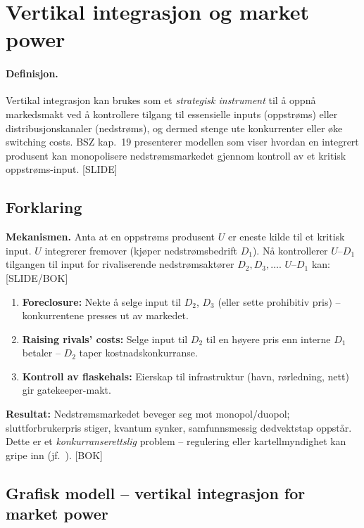 \section{Vertikal integrasjon og market power}\label{thr:vertical-integration-market-power}

\paragraph{Definisjon.} Vertikal integrasjon kan brukes som et \emph{strategisk instrument} til å oppnå markedsmakt ved å kontrollere tilgang til essensielle inputs (oppstrøms) eller distribusjonskanaler (nedstrøms), og dermed stenge ute konkurrenter eller øke switching costs. BSZ kap.\ 19 presenterer modellen som viser hvordan en integrert produsent kan monopolisere nedstrømsmarkedet gjennom kontroll av et kritisk oppstrøms-input. [SLIDE]

\subsection*{Forklaring}

\textbf{Mekanismen.} Anta at en oppstrøms produsent $U$ er eneste kilde til et kritisk input. $U$ integrerer fremover (kjøper nedstrømsbedrift $D_1$). Nå kontrollerer $U$--$D_1$ tilgangen til input for rivaliserende nedstrømsaktører $D_2, D_3, \ldots$. $U$--$D_1$ kan: [SLIDE/BOK]

\begin{enumerate}\setlength{\itemsep}{2pt}
\item \textbf{Foreclosure:} Nekte å selge input til $D_2$, $D_3$ (eller sette prohibitiv pris) -- konkurrentene presses ut av markedet.
\item \textbf{Raising rivals' costs:} Selge input til $D_2$ til en høyere pris enn interne $D_1$ betaler -- $D_2$ taper kostnadskonkurranse.
\item \textbf{Kontroll av flaskehals:} Eierskap til infrastruktur (havn, rørledning, nett) gir gatekeeper-makt.
\end{enumerate}

\textbf{Resultat:} Nedstrømsmarkedet beveger seg mot monopol/duopol; sluttforbrukerpris stiger, kvantum synker, samfunnsmessig dødvektstap oppstår. Dette er et \emph{konkurranserettslig} problem -- regulering eller kartellmyndighet kan gripe inn (jf.\ ). [BOK]

\subsection*{Grafisk modell -- vertikal integrasjon for market power}

